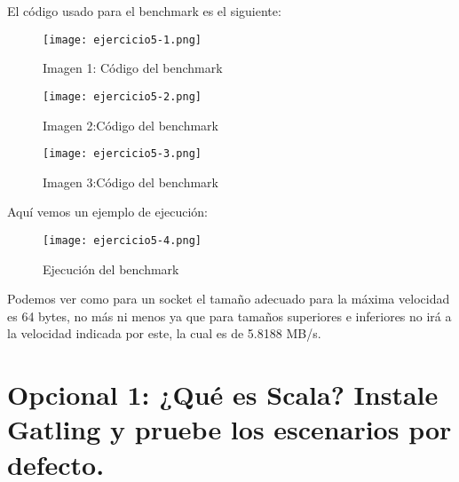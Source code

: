 	El código usado para el benchmark es el siguiente:
	
	\begin{figure}[H] 
		\centering
		\texttt{[image: ejercicio5-1.png]} 
		\label{figura33} 
		\caption{Imagen 1: Código del benchmark}
	\end{figure}
	
	\begin{figure}[H] 
		\centering
		\texttt{[image: ejercicio5-2.png]} 
		\label{figura34} 
		\caption{Imagen 2:Código del benchmark}
	\end{figure}
	
	\begin{figure}[H] 
		\centering
		\texttt{[image: ejercicio5-3.png]} 
		\label{figura35} 
		\caption{Imagen 3:Código del benchmark}
	\end{figure}
	
	Aquí vemos un ejemplo de ejecución:
	
	\begin{figure}[H] 
		\centering
		\texttt{[image: ejercicio5-4.png]} 
		\label{figura36} 
		\caption{Ejecución del benchmark}
	\end{figure}
	
	Podemos ver como para un socket el tamaño adecuado para la máxima velocidad es 64 bytes, no más ni menos ya que para tamaños superiores e inferiores no irá a la velocidad indicada por este, la cual es de 5.8188 MB/s.
	
	\section{Opcional 1: ¿Qué es Scala? Instale Gatling y pruebe los escenarios por defecto.}
	



	





